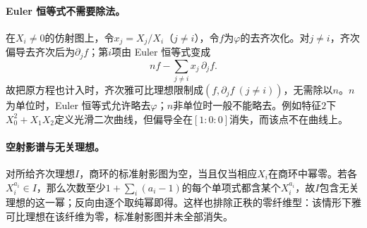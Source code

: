 \paragraph{Euler 恒等式不需要除法。}
在$X_i\ne0$的仿射图上，令$x_j=X_j/X_i$（$j\ne i$），令$f$为$\varphi$的去齐次化。对$j\ne i$，齐次偏导去齐次后为$\partial_j f$；第$i$项由 Euler 恒等式变成
\[
n f-\sum_{j\ne i}x_j\,\partial_j f.
\]
故把原方程也计入时，齐次雅可比理想限制成$(f,\partial_j f\ (j\ne i))$，无需除以$n$。$n$为单位时，Euler 恒等式允许略去$\varphi$；$n$非单位时一般不能略去。例如特征$2$下$X_0^2+X_1X_2$定义光滑二次曲线，但偏导全在$[1:0:0]$消失，而该点不在曲线上。

\paragraph{空射影谱与无关理想。}
对所给齐次理想$I$，商环的标准射影图为空，当且仅当相应$X_i$在商环中幂零。若各$X_i^{a_i}\in I$，那么次数至少$1+\sum_i(a_i-1)$的每个单项式都含某个$X_i^{a_i}$，故$I$包含无关理想的这一幂；反向由逐个取纯幂即得。这样也排除正秩的零纤维型：该情形下雅可比理想在该纤维为零，标准射影图并未全部消失。
\endgroup
